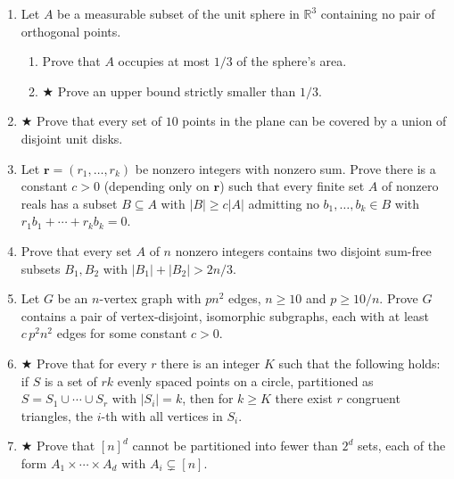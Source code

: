 \begin{enumerate}[itemsep=4pt]
  \item Let $A$ be a measurable subset of the unit sphere in $\mathbb{R}^3$
        containing no pair of orthogonal points.
        \begin{enumerate}
          \item Prove that $A$ occupies at most $1/3$ of the sphere's area.
          \item $\bigstar$ Prove an upper bound strictly smaller than $1/3$.
        \end{enumerate}
  \item $\bigstar$ Prove that every set of $10$ points in the plane can be
        covered by a union of disjoint unit disks.
  \item Let $\mathbf r=(r_1,\dots,r_k)$ be nonzero integers with nonzero sum.
        Prove there is a constant $c>0$ (depending only on $\mathbf r$) such
        that every finite set $A$ of nonzero reals has a subset $B\subseteq A$
        with $|B|\ge c|A|$ admitting no $b_1,\dots,b_k\in B$ with
        $r_1b_1+\cdots+r_kb_k=0$.
  \item Prove that every set $A$ of $n$ nonzero integers contains two disjoint
        sum-free subsets $B_1,B_2$ with $|B_1|+|B_2|>2n/3$.
  \item Let $G$ be an $n$-vertex graph with $pn^2$ edges, $n\ge10$ and
        $p\ge10/n$. Prove $G$ contains a pair of vertex-disjoint, isomorphic
        subgraphs, each with at least $c\,p^2n^2$ edges for some constant
        $c>0$.
  \item $\bigstar$ Prove that for every $r$ there is an integer $K$ such that
        the following holds: if $S$ is a set of $rk$ evenly spaced points on a
        circle, partitioned as $S=S_1\cup\cdots\cup S_r$ with $|S_i|=k$, then
        for $k\ge K$ there exist $r$ congruent triangles, the $i$-th with all
        vertices in $S_i$.
  \item $\bigstar$ Prove that $[n]^d$ cannot be partitioned into fewer than
        $2^d$ sets, each of the form $A_1\times\cdots\times A_d$ with
        $A_i\subsetneq[n]$.
\end{enumerate}
